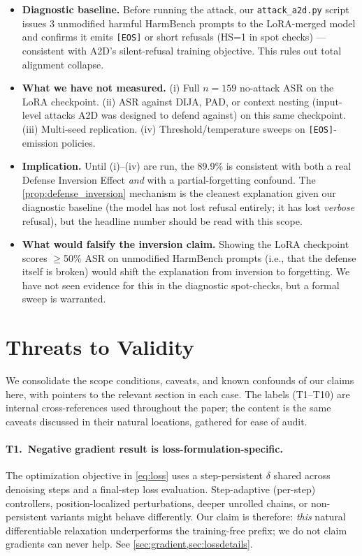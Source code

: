 \documentclass{article}
\theoremstyle{coloredthm}
\begin{document}
\begin{itemize}
    \item \textbf{Diagnostic baseline.} Before running the attack, our \texttt{attack\_a2d.py} script issues 3 unmodified harmful HarmBench prompts to the LoRA-merged model and confirms it emits \texttt{[EOS]} or short refusals (HS=1 in spot checks) --- consistent with A2D's silent-refusal training objective. This rules out total alignment collapse.
    \item \textbf{What we have not measured.} (i) Full $n{=}159$ no-attack ASR on the LoRA checkpoint. (ii) ASR against DIJA, PAD, or context nesting (input-level attacks A2D was designed to defend against) on this same checkpoint. (iii) Multi-seed replication. (iv) Threshold/temperature sweeps on \texttt{[EOS]}-emission policies.
    \item \textbf{Implication.} Until (i)--(iv) are run, the 89.9\% is consistent with both a real Defense Inversion Effect \emph{and} with a partial-forgetting confound. The \cref{prop:defense_inversion} mechanism is the cleanest explanation given our diagnostic baseline (the model has not lost refusal entirely; it has lost \emph{verbose} refusal), but the headline number should be read with this scope.
    \item \textbf{What would falsify the inversion claim.} Showing the LoRA checkpoint scores $\geq$50\% ASR on unmodified HarmBench prompts (i.e., that the defense itself is broken) would shift the explanation from inversion to forgetting. We have not seen evidence for this in the diagnostic spot-checks, but a formal sweep is warranted.
\end{itemize}

\section{Threats to Validity}
\label{sec:threats}

We consolidate the scope conditions, caveats, and known confounds of our claims here, with pointers to the relevant section in each case. The labels (T1--T10) are internal cross-references used throughout the paper; the content is the same caveats discussed in their natural locations, gathered for ease of audit.

\paragraph{T1.\ Negative gradient result is loss-formulation-specific.} The optimization objective in \cref{eq:loss} uses a step-persistent $\delta$ shared across denoising steps and a final-step loss evaluation. Step-adaptive (per-step) controllers, position-localized perturbations, deeper unrolled chains, or non-persistent variants might behave differently. Our claim is therefore: \emph{this} natural differentiable relaxation underperforms the training-free prefix; we do not claim gradients can never help. See \cref{sec:gradient,sec:lossdetails}.
\end{document}
